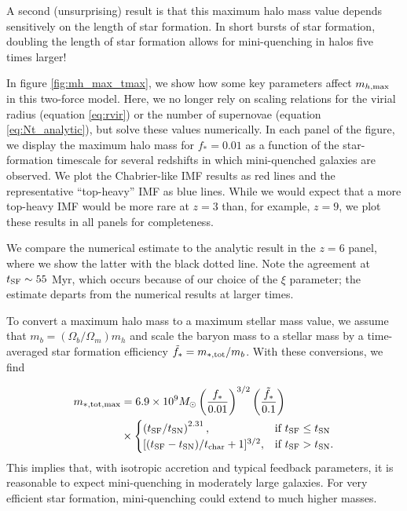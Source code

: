 \documentclass[a4paper,11pt]{article}
\begin{document}
A second (unsurprising) result is that this maximum halo mass value depends sensitively on the length of star formation. In short bursts of star formation, doubling the length of star formation allows for mini-quenching in halos five times larger!

In figure \ref{fig:mh_max_tmax}, we show how some key parameters affect $m_{h, \rm max}$ in this two-force model. Here, we no longer rely on scaling relations for the virial radius (equation \ref{eq:rvir}) or the number of supernovae (equation \ref{eq:Nt_analytic}), but solve these values numerically. In each panel of the figure, we display the maximum halo mass for $f_{*} = 0.01$ as a function of the star-formation timescale for several redshifts in which mini-quenched galaxies are observed. We plot the Chabrier-like IMF results as red lines and the representative ``top-heavy'' IMF as blue lines. While we would expect that a more top-heavy IMF would be more rare at $z = 3$ than, for example, $z = 9$, we plot these results in all panels for completeness. 

We compare the numerical estimate to the analytic result in the $z=6$ panel, where we show the latter with the black dotted line. Note the agreement at $t_{\rm SF} \sim 55$ Myr, which occurs because of our choice of the $\xi$ parameter; the estimate departs from the numerical results at larger times. 

To convert a maximum halo mass to a maximum stellar mass value, we assume that $m_{b} = (\Omega_{b}/\Omega_{m}) m_{h}$ and scale the baryon mass to a stellar mass by a time-averaged star formation efficiency $\tilde{f}_{*} = m_{*, \rm tot} / m_{b}$. With these conversions, we find 

\begin{align}
m_{*, \rm tot, max} & = 6.9 \times 10^{9} M_{\odot} \left( \frac{f_{*}}{0.01} \right)^{3/2} \left( \frac{\tilde{f}_{*}}{0.1} \right) \\
    & \times 
    \begin{cases}
        \left( t_{\rm SF} / t_{\rm SN} \right)^{2.31}, & \text{if } t_{\rm SF} \leq t_{\rm SN} \\
        [(t_{\rm SF} - t_{\rm SN})/t_{\rm char} + 1]^{3/2},  & \text{if } t_{\rm SF} > t_{\rm SN}.
    \end{cases} \label{eq:mstar_max}
\end{align}
%
This implies that, with isotropic accretion and typical feedback parameters, it is reasonable to expect mini-quenching in moderately large galaxies. For very efficient star formation, mini-quenching could extend to much higher masses.
\end{document}
